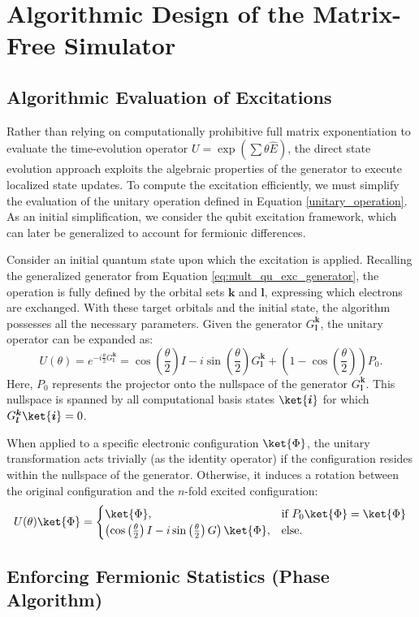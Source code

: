 \chapter{Algorithmic Design of the Matrix-Free Simulator}
\label{c:approaches}



\section{Algorithmic Evaluation of Excitations}
Rather than relying on computationally prohibitive full matrix exponentiation to evaluate the time-evolution operator $U = \exp(\sum \theta \hat{E})$, the direct state evolution approach exploits the algebraic properties of the generator to execute localized state updates. To compute the excitation efficiently, we must simplify the evaluation of the unitary operation defined in Equation \eqref{unitary_operation}. As an initial simplification, we consider the qubit excitation framework, which can later be generalized to account for fermionic differences. 

Consider an initial quantum state upon which the excitation is applied. Recalling the generalized generator from Equation \eqref{eq:mult_qu_exc_generator}, the operation is fully defined by the orbital sets $\boldsymbol{k}$ and $\boldsymbol{l}$, expressing which electrons are exchanged. With these target orbitals and the initial state, the algorithm possesses all the necessary parameters. Given the generator $G^{\boldsymbol{k}}_{\boldsymbol{l}}$, the unitary operator can be expanded as:
\begin{equation}
	U(\theta) = e^{-i\frac{\theta}{2}G^{\boldsymbol{k}}_{\boldsymbol{l}}} = \cos\left(\frac{\theta}{2}\right) I - i\sin\left(\frac{\theta}{2}\right)G^{\boldsymbol{k}}_{\boldsymbol{l}} + \left(1 - \cos\left(\frac{\theta}{2}\right)\right) P_0.
\end{equation}
Here, $P_0$ represents the projector onto the nullspace of the generator $G^{\boldsymbol{k}}_{\boldsymbol{l}}$. This nullspace is spanned by all computational basis states $\ket{\boldsymbol{i}}$ for which $G^{\boldsymbol{k}}_{\boldsymbol{l}} \ket{\boldsymbol{i}} = 0$.

When applied to a specific electronic configuration $\ket{\Phi}$, the unitary transformation acts trivially (as the identity operator) if the configuration resides within the nullspace of the generator. Otherwise, it induces a rotation between the original configuration and the $n$-fold excited configuration:
\begin{equation}
	 U(\theta) \ket{\Phi} = \begin{cases} \ket{\Phi}, & \text{if } P_0\ket{\Phi} = \ket{\Phi} \\ \left(\cos\left(\frac{\theta}{2}\right) I - i\sin\left(\frac{\theta}{2}\right)G\right)\ket{\Phi}, & \text{else.} \end{cases} 
\end{equation}
\cite[Chapter II.A]{kottmann2020feasible}






\section{Enforcing Fermionic Statistics (Phase Algorithm)}






